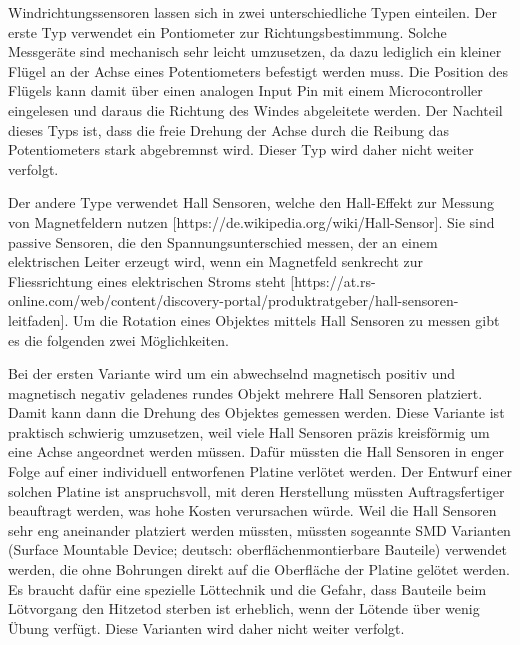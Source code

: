Windrichtungssensoren lassen sich in zwei unterschiedliche Typen einteilen. Der erste Typ verwendet ein Pontiometer zur Richtungsbestimmung. Solche Messgeräte sind mechanisch sehr leicht umzusetzen, da dazu lediglich ein kleiner Flügel an der Achse eines Potentiometers befestigt werden muss. Die Position des Flügels kann damit über einen analogen Input Pin mit einem Microcontroller eingelesen und daraus die Richtung des Windes abgeleitete werden. Der Nachteil dieses Typs ist, dass die freie Drehung der Achse durch die Reibung das Potentiometers stark abgebremnst wird. Dieser Typ wird daher nicht weiter verfolgt.

Der andere Type verwendet Hall Sensoren, welche den Hall-Effekt zur Messung von 
Magnetfeldern nutzen [https://de.wikipedia.org/wiki/Hall-Sensor]. Sie sind passive Sensoren, die den Spannungsunterschied messen, der an einem elektrischen Leiter erzeugt wird, wenn ein Magnetfeld senkrecht zur Fliessrichtung eines elektrischen Stroms steht [https://at.rs-online.com/web/content/discovery-portal/produktratgeber/hall-sensoren-leitfaden]. Um die Rotation eines Objektes mittels Hall Sensoren zu messen gibt es die folgenden zwei Möglichkeiten. 

Bei der ersten Variante wird um ein abwechselnd magnetisch positiv und magnetisch negativ geladenes rundes Objekt mehrere Hall Sensoren platziert. Damit kann dann die Drehung des Objektes gemessen werden. Diese Variante ist praktisch schwierig umzusetzen, weil viele Hall Sensoren präzis kreisförmig um eine Achse angeordnet werden müssen. Dafür müssten die Hall Sensoren in enger Folge auf einer individuell entworfenen Platine verlötet werden. Der Entwurf einer solchen Platine ist anspruchsvoll, mit deren Herstellung müssten Auftragsfertiger beauftragt werden, was hohe Kosten verursachen würde. Weil die Hall Sensoren sehr eng aneinander platziert werden müssten, müssten sogeannte SMD Varianten (Surface Mountable Device; deutsch: oberflächenmontierbare Bauteile) verwendet werden, die ohne Bohrungen direkt auf die Oberfläche der  Platine gelötet werden. Es braucht dafür eine spezielle Löttechnik und die Gefahr, dass Bauteile beim Lötvorgang den Hitzetod sterben ist erheblich, wenn der Lötende über wenig Übung verfügt. Diese Varianten wird daher nicht weiter verfolgt.

